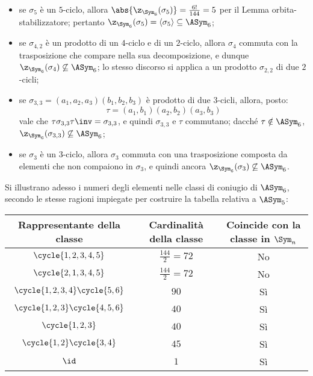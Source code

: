 \documentclass[11pt]{scrartcl}
\begin{document}
	\begin{itemize}
		\item se $\sigma_5$ è un $5$-ciclo, allora $\abs{\z_{\Sym_6}(\sigma_5)} = \frac{6!}{144} = 5$ per il Lemma orbita-stabilizzatore; pertanto
		$\z_{\Sym_6}(\sigma_5) = \langle \sigma_5 \rangle \subseteq \ASym_6$;
		\item se $\sigma_{4,2}$ è un prodotto di un $4$-ciclo e di un $2$-ciclo, allora
		$\sigma_4$ commuta con la trasposizione che compare nella sua decomposizione,
		e dunque $\z_{\Sym_6}(\sigma_4) \not\subseteq \ASym_6$; lo stesso
		discorso si applica a un prodotto $\sigma_{2,2}$ di due $2$-cicli;
		\item se $\sigma_{3,3} = (a_1, a_2, a_3)(b_1, b_2, b_3)$ è prodotto di due $3$-cicli,
		allora, posto:
		\[ \tau = (a_1, b_1)(a_2, b_2)(a_3, b_3) \]
		vale che
		$\tau \sigma_{3,3} \tau\inv = \sigma_{3,3}$, e quindi $\sigma_{3,3}$ e $\tau$
		commutano; dacché $\tau \notin \ASym_6$, $\z_{\Sym_6}(\sigma_{3,3}) \not\subseteq \ASym_6$;
		\item se $\sigma_3$ è un $3$-ciclo, allora $\sigma_3$ commuta con una trasposizione
		composta da elementi che non compaiono in $\sigma_3$, e quindi ancora
		$\z_{\Sym_6}(\sigma_{3}) \not\subseteq \ASym_6$.
	\end{itemize}
	
	Si illustrano adesso i numeri degli elementi nelle classi di coniugio di
	$\ASym_6$, secondo le stesse ragioni impiegate per costruire la tabella
	relativa a $\ASym_5$:
	
	\begingroup
	\renewcommand{\arraystretch}{1.5}
	\begin{center}
		\begin{tabular}{c|c|c}
			Rappresentante della classe & Cardinalità della classe & Coincide con la classe in $\Sym_n$ \\
			\hline
			$\cycle{1, 2, 3, 4, 5}$ & $\frac{144}{2} = 72$ & No \\
			$\cycle{2, 1, 3, 4, 5}$ & $\frac{144}{2} = 72$ & No \\
			$\cycle{1, 2, 3, 4} \cycle{5, 6}$ & $90$ & Sì \\
			$\cycle{1, 2, 3} \cycle{4, 5, 6}$ & $40$ & Sì \\
			$\cycle{1, 2, 3}$ & $40$ & Sì \\
			$\cycle{1, 2} \cycle{3, 4}$ & $45$ & Sì \\
			$\id$ & $1$ & Sì 
		\end{tabular}
	\end{center}
	\endgroup
	
\end{document}
